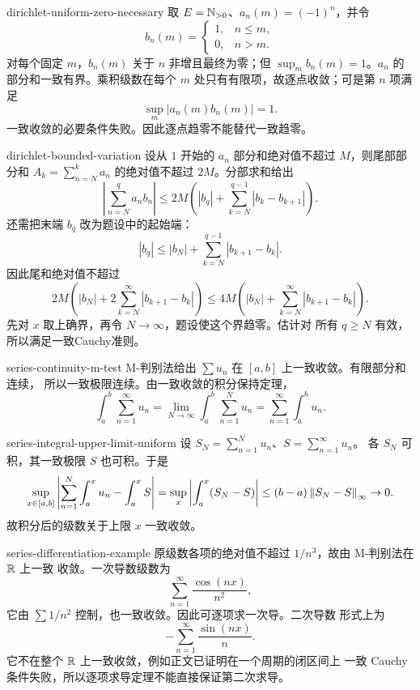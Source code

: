 \begin{solution}{dirichlet-uniform-zero-necessary}
取 \(E=\mathbb{N}_{>0}\)、\(a_n(m)=(-1)^n\)，并令
\[
 b_n(m)=
 \begin{cases}
 1,&n\le m,\\
 0,&n>m.
 \end{cases}
\]
对每个固定 \(m\)，\(b_n(m)\) 关于 \(n\) 非增且最终为零；但
\(\sup_mb_n(m)=1\)。\(a_n\) 的部分和一致有界。乘积级数在每个
\(m\) 处只有有限项，故逐点收敛；可是第 \(n\) 项满足
\[
 \sup_m|a_n(m)b_n(m)|=1.
\]
一致收敛的必要条件失败。因此逐点趋零不能替代一致趋零。
\end{solution}

\begin{solution}{dirichlet-bounded-variation}
设从 \(1\) 开始的 \(a_n\) 部分和绝对值不超过 \(M\)，则尾部部分和
\(A_k=\sum_{n=N}^ka_n\) 的绝对值不超过 \(2M\)。分部求和给出
\[
 \left|\sum_{n=N}^qa_nb_n\right|
 \le2M\left(
 |b_q|+\sum_{k=N}^{q-1}|b_k-b_{k+1}|
 \right).
\]
还需把末端 \(b_q\) 改为题设中的起始端：
\[
 |b_q|\le |b_N|+\sum_{k=N}^{q-1}|b_{k+1}-b_k|.
\]
因此尾和绝对值不超过
\[
 2M\left(|b_N|+2\sum_{k=N}^\infty|b_{k+1}-b_k|\right)
 \le4M\left(|b_N|+\sum_{k=N}^\infty|b_{k+1}-b_k|\right).
\]
先对 \(x\) 取上确界，再令 \(N\to\infty\)，题设使这个界趋零。估计对
所有 \(q\ge N\) 有效，所以满足一致Cauchy准则。
\end{solution}

\begin{solution}{series-continuity-m-test}
M-判别法给出 \(\sum u_n\) 在 \([a,b]\) 上一致收敛。有限部分和连续，
所以一致极限连续。由一致收敛的积分保持定理，
\[
 \int_a^b\sum_{n=1}^\infty u_n
 =\lim_{N\to\infty}\int_a^b\sum_{n=1}^Nu_n
 =\sum_{n=1}^\infty\int_a^bu_n.
\]
\end{solution}

\begin{solution}{series-integral-upper-limit-uniform}
设 \(S_N=\sum_{n=1}^Nu_n\)、\(S=\sum_{n=1}^\infty u_n\)。
各 \(S_N\) 可积，其一致极限 \(S\) 也可积。于是
\[
 \sup_{x\in[a,b]}
 \left|\sum_{n=1}^N\int_a^xu_n-\int_a^xS\right|
 =\sup_x\left|\int_a^x(S_N-S)\right|
 \le(b-a)\left\lVert S_N-S\right\rVert_\infty\to0.
\]
故积分后的级数关于上限 \(x\) 一致收敛。
\end{solution}

\begin{solution}{series-differentiation-example}
原级数各项的绝对值不超过 \(1/n^3\)，故由 M-判别法在 \(\mathbb{R}\) 上一致
收敛。一次导数级数为
\[
 \sum_{n=1}^\infty\frac{\cos(nx)}{n^2},
\]
它由 \(\sum1/n^2\) 控制，也一致收敛。因此可逐项求一次导。二次导数
形式上为
\[
 -\sum_{n=1}^\infty\frac{\sin(nx)}n.
\]
它不在整个 \(\mathbb{R}\) 上一致收敛，例如正文已证明在一个周期的闭区间上
一致 Cauchy 条件失败，所以逐项求导定理不能直接保证第二次求导。
\end{solution}

